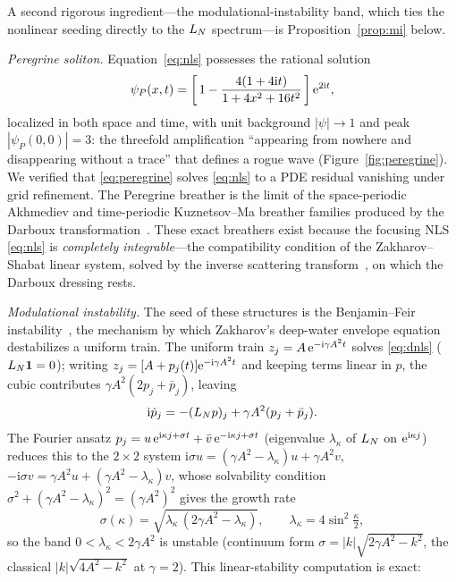 A second rigorous ingredient---the modulational-instability band, which ties the nonlinear seeding
directly to the $L_N$ spectrum---is Proposition~\ref{prop:mi} below.

\emph{Peregrine soliton.} Equation~\eqref{eq:nls} possesses the rational solution~\cite{Peregrine}
\begin{equation}\label{eq:peregrine}
  \psi_P(x,t) = \left[\,1 - \frac{4(1+4\mathrm i t)}{1+4x^2+16t^2}\,\right]\mathrm{e}^{2\mathrm i t},
\end{equation}
localized in both space and time, with unit background $|\psi|\to1$ and peak $|\psi_P(0,0)|=3$: the
threefold amplification ``appearing from nowhere and disappearing without a trace'' that defines a
rogue wave (Figure~\ref{fig:peregrine}). We verified that \eqref{eq:peregrine} solves \eqref{eq:nls}
to a PDE residual vanishing under grid refinement. The Peregrine breather is the limit of the
space-periodic Akhmediev and time-periodic Kuznetsov--Ma breather families produced by the Darboux
transformation~\cite{Akhmediev}. These exact breathers exist because the focusing NLS \eqref{eq:nls}
is \emph{completely integrable}---the compatibility condition of the Zakharov--Shabat linear system,
solved by the inverse scattering transform~\cite{ZakharovShabat}, on which the Darboux dressing rests.

\emph{Modulational instability.} The seed of these structures is the Benjamin--Feir
instability~\cite{BenjaminFeir,ZakharovOstrovsky}, the mechanism by which Zakharov's deep-water
envelope equation~\cite{Zakharov} destabilizes a uniform train. The uniform train
$z_j=A\,\mathrm{e}^{-\mathrm i\gamma A^2 t}$ solves \eqref{eq:dnls} ($L_N\mathbf1=0$); writing
$z_j=[A+p_j(t)]\mathrm{e}^{-\mathrm i\gamma A^2 t}$ and keeping terms linear in $p$, the cubic contributes
$\gamma A^2(2p_j+\bar p_j)$, leaving
\[
  \mathrm i\dot p_j=-(L_N p)_j+\gamma A^2(p_j+\bar p_j).
\]
The Fourier ansatz $p_j=u\,\mathrm{e}^{\mathrm i\kappa j+\sigma t}+\bar v\,\mathrm{e}^{-\mathrm i\kappa j+\sigma t}$
(eigenvalue $\lambda_\kappa$ of $L_N$ on $\mathrm{e}^{\mathrm i\kappa j}$) reduces this to the $2\times2$ system
$\mathrm i\sigma u=(\gamma A^2-\lambda_\kappa)u+\gamma A^2v$, $-\mathrm i\sigma v=\gamma A^2u+(\gamma A^2-\lambda_\kappa)v$,
whose solvability condition $\sigma^2+(\gamma A^2-\lambda_\kappa)^2=(\gamma A^2)^2$ gives the growth rate
\begin{equation}\label{eq:mi}
  \sigma(\kappa)=\sqrt{\lambda_\kappa\,(2\gamma A^2-\lambda_\kappa)},\qquad \lambda_\kappa=4\sin^2\tfrac\kappa2,
\end{equation}
so the band $0<\lambda_\kappa<2\gamma A^2$ is unstable (continuum form $\sigma=|k|\sqrt{2\gamma A^2-k^2}$, the
classical $|k|\sqrt{4A^2-k^2}$ at $\gamma=2$). This linear-stability computation is exact:

